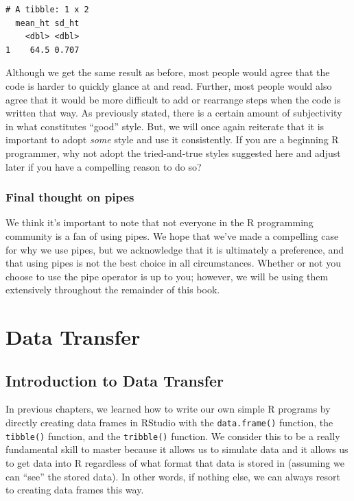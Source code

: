 \documentclass[
  letterpaper,
  DIV=11,
  numbers=noendperiod]{scrreprt}
\begin{document}
\begin{verbatim}
# A tibble: 1 x 2
  mean_ht sd_ht
    <dbl> <dbl>
1    64.5 0.707
\end{verbatim}

Although we get the same result as before, most people would agree that
the code is harder to quickly glance at and read. Further, most people
would also agree that it would be more difficult to add or rearrange
steps when the code is written that way. As previously stated, there is
a certain amount of subjectivity in what constitutes ``good'' style.
But, we will once again reiterate that it is important to adopt
\emph{some} style and use it consistently. If you are a beginning R
programmer, why not adopt the tried-and-true styles suggested here and
adjust later if you have a compelling reason to do so?

\section{Final thought on pipes}\label{final-thought-on-pipes}

We think it's important to note that not everyone in the R programming
community is a fan of using pipes. We hope that we've made a compelling
case for why we use pipes, but we acknowledge that it is ultimately a
preference, and that using pipes is not the best choice in all
circumstances. Whether or not you choose to use the pipe operator is up
to you; however, we will be using them extensively throughout the
remainder of this book.

\part{Data Transfer}

\chapter{Introduction to Data
Transfer}\label{introduction-to-data-transfer}

In previous chapters, we learned how to write our own simple R programs
by directly creating data frames in RStudio with the
\texttt{data.frame()} function, the \texttt{tibble()} function, and the
\texttt{tribble()} function. We consider this to be a really fundamental
skill to master because it allows us to simulate data and it allows us
to get data into R regardless of what format that data is stored in
(assuming we can ``see'' the stored data). In other words, if nothing
else, we can always resort to creating data frames this way.
\end{document}
